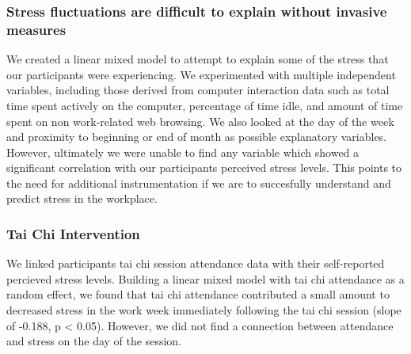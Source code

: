 \subsubsection{Stress fluctuations are difficult to explain without invasive measures}
We created a linear mixed model to attempt to explain some of the stress that our participants were experiencing. We experimented with multiple independent variables, including those derived from computer interaction data such as total time spent actively on the computer, percentage of time idle, and amount of time spent on non work-related web browsing. We also looked at the day of the week and proximity to beginning or end of month as possible explanatory variables. However, ultimately we were unable to find any variable which showed a significant correlation with our participants perceived stress levels. This points to the need for additional instrumentation if we are to succesfully understand and predict stress in the workplace.

\subsubsection{Tai Chi Intervention}
We linked participants tai chi session attendance data with their self-reported percieved stress levels. Building a linear mixed model with tai chi attendance as a random effect, we found that tai chi attendance contributed a small amount to decreased stress in the work week immediately following the tai chi session (slope of -0.188, p < 0.05). However, we did not find a connection between attendance and stress on the day of the session.

